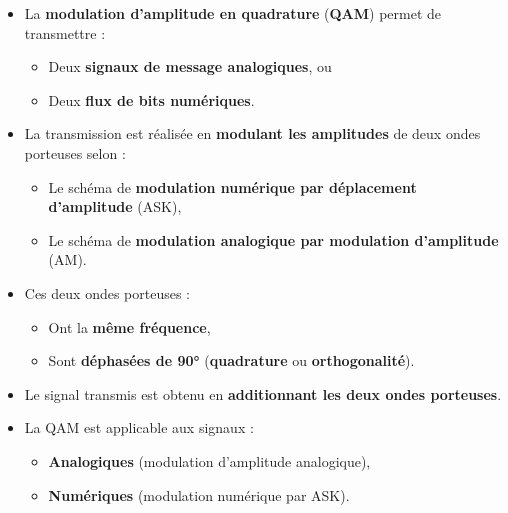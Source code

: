 \begin{itemize}
    \item La \textbf{modulation d'amplitude en quadrature} (\textbf{QAM}) permet de transmettre :
    \begin{itemize}
        \item Deux \textbf{signaux de message analogiques}, ou
        \item Deux \textbf{flux de bits numériques}.
    \end{itemize}
    \item La transmission est réalisée en \textbf{modulant les amplitudes} de deux ondes porteuses selon :
    \begin{itemize}
        \item Le schéma de \textbf{modulation numérique par déplacement d'amplitude} (ASK),
        \item Le schéma de \textbf{modulation analogique par modulation d'amplitude} (AM).
    \end{itemize}
    \item Ces deux ondes porteuses :
    \begin{itemize}
        \item Ont la \textbf{même fréquence},
        \item Sont \textbf{déphasées de 90°} (\textbf{quadrature} ou \textbf{orthogonalité}).
    \end{itemize}
    \item Le signal transmis est obtenu en \textbf{additionnant les deux ondes porteuses}.
    \item La QAM est applicable aux signaux :
    \begin{itemize}
        \item \textbf{Analogiques} (modulation d'amplitude analogique),
        \item \textbf{Numériques} (modulation numérique par ASK).
    \end{itemize}
\end{itemize}
